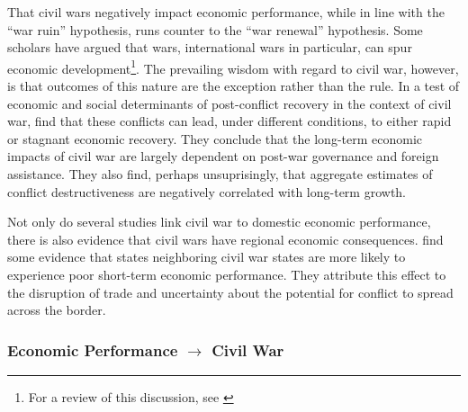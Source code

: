 That civil wars negatively impact economic performance, while in line with the ``war ruin'' hypothesis, runs counter to the ``war renewal'' hypothesis.  Some scholars have argued that wars, international wars in particular, can spur economic development\footnote{For a review of this discussion, see \cite{rasler:thompson:1985}}.  The prevailing wisdom with regard to civil war, however, is that outcomes of this nature are the exception rather than the rule.  In a test of economic and social determinants of post-conflict recovery in the context of civil war, \cite{kang:meernick:2005} find that these conflicts can lead, under different conditions, to either rapid or stagnant economic recovery.  They conclude that the long-term economic impacts of civil war are largely dependent on post-war governance and foreign assistance.  They also find, perhaps unsuprisingly, that aggregate estimates of conflict destructiveness are negatively correlated with long-term growth.

Not only do several studies link civil war to domestic economic performance, there is also evidence that civil wars have regional economic consequences.  \cite{murdoch:sandler:2002} find some evidence that states neighboring civil war states are more likely to experience poor short-term economic performance.  They attribute this effect to the disruption of trade and uncertainty about the potential for conflict to spread across the border.

\subsubsection{Economic Performance $\rightarrow$ Civil War}

